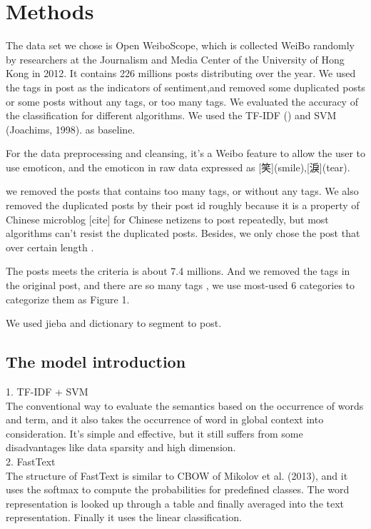 \chapter{Methods}

The data set we chose is Open WeiboScope, which is collected WeiBo randomly by researchers at the Journalism and Media Center of the University of Hong Kong in 2012. It contains 226 millions posts distributing over the year. We used the tags in post as the indicators of sentiment,and removed some duplicated posts or some posts without any tags, or too many tags. We evaluated the accuracy of the classification for different algorithms.  We used the TF-IDF () and SVM (Joachims, 1998). as baseline.

For the data preprocessing and cleansing, it's a Weibo feature to allow the user to use emoticon, and the emoticon in raw data expressed as [笑](smile),[淚](tear).

we removed the posts that contains too many tags, or without any tags. We also removed the duplicated posts by their post id roughly because it is a property of Chinese microblog [cite] for Chinese netizens to post repeatedly, but most algorithms can't resist the duplicated posts. Besides, we only chose the post that over certain length .

The posts meets the criteria is about 7.4 millions. And we removed the tags in the original post, and there are so many tags , we use most-used 6 categories to categorize them as Figure 1.

We used jieba and dictionary to segment to post.



\section{The model introduction}

1. TF-IDF + SVM \\

	The conventional way to evaluate the semantics based on the occurrence of words and term, and it also takes the occurrence of word in global context into consideration.  It's simple and effective, but it still suffers from some disadvantages like data sparsity and high dimension. \\
	
2. FastText\\
	
	The structure of FastText is similar to CBOW of Mikolov et al. (2013), and it uses the softmax to compute the probabilities for predefined classes. The word representation is looked up through a table and finally averaged into the text representation. Finally it uses the linear classification.

